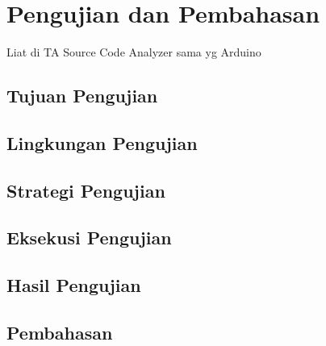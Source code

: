 \chapter{Pengujian dan Pembahasan}

Liat di TA Source Code Analyzer sama yg Arduino

\section{Tujuan Pengujian}
\blindtext

\section{Lingkungan Pengujian}
\blindtext

\section{Strategi Pengujian}
\blindtext

\section{Eksekusi Pengujian}
\blindtext

\section{Hasil Pengujian}
\blindtext

\section{Pembahasan}
\blindtext